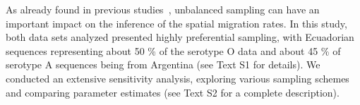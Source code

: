 \documentclass[10pt]{article}
\begin{document}
% 
% 
As already found in previous studies~\cite{Faria2012, Lemey2013}, unbalanced sampling can have an important impact on the inference of the spatial migration rates.
In this study, both data sets analyzed presented highly preferential sampling, with Ecuadorian sequences representing about 50 \% of the serotype O data and about 45 \% of serotype A sequences being from Argentina (see Text S1 for details).
We conducted an extensive sensitivity analysis, exploring various sampling schemes and comparing parameter estimates (see Text S2 for a complete description).
% 
% 
\end{document}
